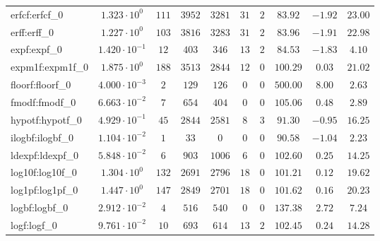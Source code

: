 \begin{tabular}{|l|c|c|c|c|c|c|c|c|c|}
erfcf:erfcf\_0               & $ 1.323 \cdot 10^{0}  $ & $ 111    $ & $ 3952  $ & $ 3281  $ & $ 31  $ & $ 2  $ & $ 83.92       $ & $ -1.92   $ & $ 23.00   $ \\
erff:erff\_0                 & $ 1.227 \cdot 10^{0}  $ & $ 103    $ & $ 3816  $ & $ 3283  $ & $ 31  $ & $ 2  $ & $ 83.96       $ & $ -1.91   $ & $ 22.98   $ \\
expf:expf\_0                 & $ 1.420 \cdot 10^{-1} $ & $ 12     $ & $ 403   $ & $ 346   $ & $ 13  $ & $ 2  $ & $ 84.53       $ & $ -1.83   $ & $ 4.10    $ \\
expm1f:expm1f\_0             & $ 1.875 \cdot 10^{0}  $ & $ 188    $ & $ 3513  $ & $ 2844  $ & $ 12  $ & $ 0  $ & $ 100.29      $ & $ 0.03    $ & $ 21.02   $ \\
floorf:floorf\_0             & $ 4.000 \cdot 10^{-3} $ & $ 2      $ & $ 129   $ & $ 126   $ & $ 0   $ & $ 0  $ & $ 500.00      $ & $ 8.00    $ & $ 2.63    $ \\
fmodf:fmodf\_0               & $ 6.663 \cdot 10^{-2} $ & $ 7      $ & $ 654   $ & $ 404   $ & $ 0   $ & $ 0  $ & $ 105.06      $ & $ 0.48    $ & $ 2.89    $ \\
hypotf:hypotf\_0             & $ 4.929 \cdot 10^{-1} $ & $ 45     $ & $ 2844  $ & $ 2581  $ & $ 8   $ & $ 3  $ & $ 91.30       $ & $ -0.95   $ & $ 16.25   $ \\
ilogbf:ilogbf\_0             & $ 1.104 \cdot 10^{-2} $ & $ 1      $ & $ 33    $ & $ 0     $ & $ 0   $ & $ 0  $ & $ 90.58       $ & $ -1.04   $ & $ 2.23    $ \\
ldexpf:ldexpf\_0             & $ 5.848 \cdot 10^{-2} $ & $ 6      $ & $ 903   $ & $ 1006  $ & $ 6   $ & $ 0  $ & $ 102.60      $ & $ 0.25    $ & $ 14.25   $ \\
log10f:log10f\_0             & $ 1.304 \cdot 10^{0}  $ & $ 132    $ & $ 2691  $ & $ 2796  $ & $ 18  $ & $ 0  $ & $ 101.21      $ & $ 0.12    $ & $ 19.62   $ \\
log1pf:log1pf\_0             & $ 1.447 \cdot 10^{0}  $ & $ 147    $ & $ 2849  $ & $ 2701  $ & $ 18  $ & $ 0  $ & $ 101.62      $ & $ 0.16    $ & $ 20.23   $ \\
logbf:logbf\_0               & $ 2.912 \cdot 10^{-2} $ & $ 4      $ & $ 516   $ & $ 540   $ & $ 0   $ & $ 0  $ & $ 137.38      $ & $ 2.72    $ & $ 7.24    $ \\
logf:logf\_0                 & $ 9.761 \cdot 10^{-2} $ & $ 10     $ & $ 693   $ & $ 614   $ & $ 13  $ & $ 2  $ & $ 102.45      $ & $ 0.24    $ & $ 14.28   $ \\

\end{tabular}
